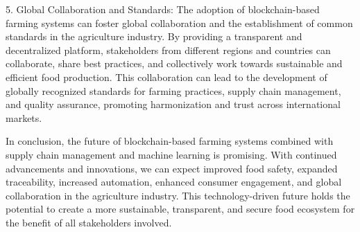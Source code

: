 {5. Global Collaboration and Standards: The adoption of blockchain-based farming systems can foster global collaboration and the establishment of common standards in the agriculture industry. By providing a transparent and decentralized platform, stakeholders from different regions and countries can collaborate, share best practices, and collectively work towards sustainable and efficient food production. This collaboration can lead to the development of globally recognized standards for farming practices, supply chain management, and quality assurance, promoting harmonization and trust across international markets.

In conclusion, the future of blockchain-based farming systems combined with supply chain management and machine learning is promising. With continued advancements and innovations, we can expect improved food safety, expanded traceability, increased automation, enhanced consumer engagement, and global collaboration in the agriculture industry. This technology-driven future holds the potential to create a more sustainable, transparent, and secure food ecosystem for the benefit of all stakeholders involved.}

